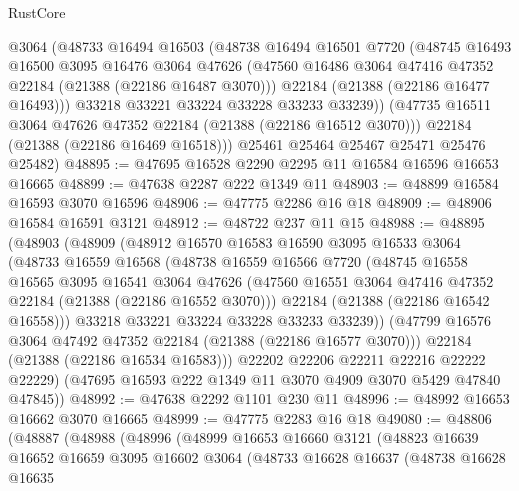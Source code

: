 \begin{lexlean}{RustCore}
\begin{coremodule}
        @3064
        (@48733
          @16494
          @16503
          (@48738
            @16494
            @16501
            @7720
            (@48745
              @16493
              @16500
              @3095
              @16476
              @3064
              @47626
              (@47560 @16486 @3064 @47416 @47352 @22184 (@21388 (@22186 @16487 @3070)))
              @22184
              (@21388 (@22186 @16477 @16493)))
            @33218
            @33221
            @33224
            @33228
            @33233
            @33239))
        (@47735 @16511 @3064 @47626 @47352 @22184 (@21388 (@22186 @16512 @3070)))
        @22184
        (@21388 (@22186 @16469 @16518)))
      @25461
      @25464
      @25467
      @25471
      @25476
      @25482)
@48895 := @47695 @16528 @2290 @2295 @11 @16584 @16596 @16653 @16665
@48899 := @47638 @2287 @222 @1349 @11
@48903 := @48899 @16584 @16593 @3070 @16596
@48906 := @47775 @2286 @16 @18
@48909 := @48906 @16584 @16591 @3121
@48912 := @48722 @237 @11 @15
@48988 := @48895
    (@48903
      (@48909
        (@48912
          @16570
          @16583
          @16590
          @3095
          @16533
          @3064
          (@48733
            @16559
            @16568
            (@48738
              @16559
              @16566
              @7720
              (@48745
                @16558
                @16565
                @3095
                @16541
                @3064
                @47626
                (@47560 @16551 @3064 @47416 @47352 @22184 (@21388 (@22186 @16552 @3070)))
                @22184
                (@21388 (@22186 @16542 @16558)))
              @33218
              @33221
              @33224
              @33228
              @33233
              @33239))
          (@47799 @16576 @3064 @47492 @47352 @22184 (@21388 (@22186 @16577 @3070)))
          @22184
          (@21388 (@22186 @16534 @16583)))
        @22202
        @22206
        @22211
        @22216
        @22222
        @22229)
      (@47695 @16593 @222 @1349 @11 @3070 @4909 @3070 @5429 @47840 @47845))
@48992 := @47638 @2292 @1101 @230 @11
@48996 := @48992 @16653 @16662 @3070 @16665
@48999 := @47775 @2283 @16 @18
@49080 := @48806
    (@48887
      (@48988
        (@48996
          (@48999
            @16653
            @16660
            @3121
            (@48823
              @16639
              @16652
              @16659
              @3095
              @16602
              @3064
              (@48733
                @16628
                @16637
                (@48738
                  @16628
                  @16635

\end{coremodule}
\end{lexlean}
